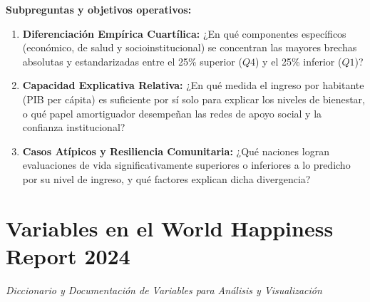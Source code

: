 \documentclass[11pt]{article}
\begin{document}
\textbf{Subpreguntas y objetivos operativos:}
\begin{enumerate}
    \item \textbf{Diferenciación Empírica Cuartílica:} ¿En qué componentes específicos (económico, de salud y socioinstitucional) se concentran las mayores brechas absolutas y estandarizadas entre el 25\% superior ($Q4$) y el 25\% inferior ($Q1$)?
    \item \textbf{Capacidad Explicativa Relativa:} ¿En qué medida el ingreso por habitante (PIB per cápita) es suficiente por sí solo para explicar los niveles de bienestar, o qué papel amortiguador desempeñan las redes de apoyo social y la confianza institucional?
    \item \textbf{Casos Atípicos y Resiliencia Comunitaria:} ¿Qué naciones logran evaluaciones de vida significativamente superiores o inferiores a lo predicho por su nivel de ingreso, y qué factores explican dicha divergencia?
\end{enumerate}

\section{Variables en el World Happiness Report 2024}

\textit{Diccionario y Documentación de Variables para Análisis y Visualización}

\vspace{0.4em}
\end{document}
